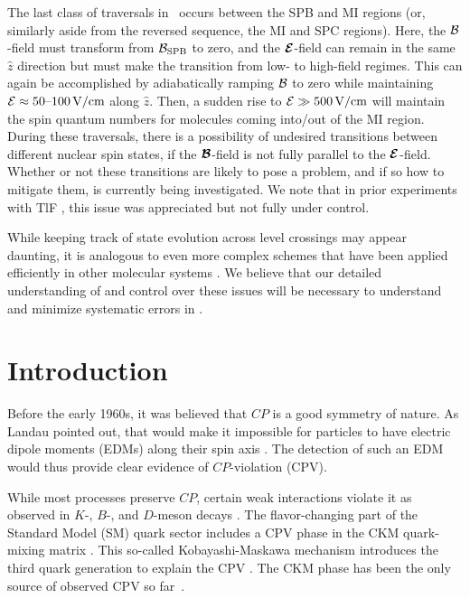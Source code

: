 The last class of traversals in \CENTREX\ occurs between the SPB and MI regions (or, similarly aside from the reversed sequence, the MI and SPC regions).  Here, the $\mathcal{B}$-field must transform from $\mathcal{B}_{\rm SPB}$ to zero, and the $\bm{\mathcal{E}}$-field can remain in the same $\hat{z}$ direction but must make the transition from low- to high-field regimes.  This can again be accomplished by adiabatically ramping $\mathcal{B}$ to zero while maintaining $\mathcal{E} \approx \hbox{50--100} \,\mathrm{V/cm}$ along $\hat{z}$.  Then, a sudden rise to $\mathcal{E} \gg 500 \,\mathrm{V/cm}$ will maintain the spin quantum numbers for molecules coming into/out of the MI region. During these traversals, there is a possibility of undesired transitions between different nuclear spin states, if the $\bm{\mathcal{B}}$-field is not fully parallel to the $\bm{\mathcal{E}}$-field. Whether or not these transitions are likely to pose a problem, and if so how to mitigate them, is currently being investigated. We note that in prior experiments with TlF \cite{wilkening1984search,cho1991tight}, this issue was appreciated but not fully under control.
                       
While keeping track of state evolution across level crossings may appear daunting, it is analogous to even more complex schemes that have been applied efficiently in other molecular systems \cite{langheckerdenschlag2008}. We believe that our detailed understanding of and control over these issues will be necessary to understand and minimize systematic errors in \CENTREX.

\section{Introduction}
\label{sec:introduction}
Before the early 1960s, it was believed that $CP$ is a good symmetry of nature. As Landau pointed out, that would make it impossible for particles to have electric dipole moments (EDMs) along their spin axis \cite{landau1957conservation}. The detection of such an EDM would thus provide clear evidence of $CP$-violation (CPV).  

While most processes preserve $CP$, certain weak interactions violate it as observed in $K$-, $B$-, and $D$-meson decays \cite{christenson1964evidence, PDG18}. The flavor-changing part of the Standard Model (SM) quark sector includes a CPV phase in the CKM quark-mixing matrix \cite{peccei1995}. This so-called Kobayashi-Maskawa mechanism introduces the third quark generation to explain the CPV \cite{kobayashi1973cp}. The CKM phase has been the only source of observed CPV so far~\cite{PDG18}.

